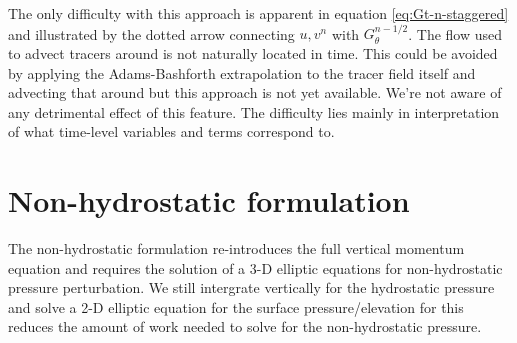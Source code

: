 The only difficulty with this approach is apparent in equation
\ref{eq:Gt-n-staggered} and illustrated by the dotted arrow
connecting $u,v^n$ with $G_\theta^{n-1/2}$. The flow used to advect
tracers around is not naturally located in time. This could be avoided
by applying the Adams-Bashforth extrapolation to the tracer field
itself and advecting that around but this approach is not yet
available. We're not aware of any detrimental effect of this
feature. The difficulty lies mainly in interpretation of what
time-level variables and terms correspond to.


\section{Non-hydrostatic formulation}
\label{sect:non-hydrostatic}

The non-hydrostatic formulation re-introduces the full vertical
momentum equation and requires the solution of a 3-D elliptic
equations for non-hydrostatic pressure perturbation. We still
intergrate vertically for the hydrostatic pressure and solve a 2-D
elliptic equation for the surface pressure/elevation for this reduces
the amount of work needed to solve for the non-hydrostatic pressure.

